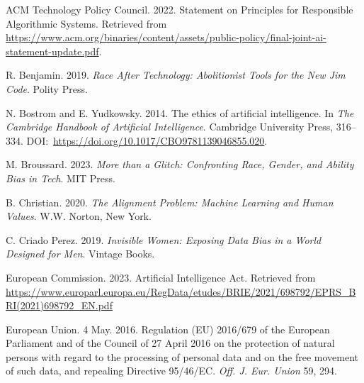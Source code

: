 \begin{thebibliography}{}

 ACM Technology Policy Council. 2022. Statement on Principles for Responsible Algorithmic Systems. Retrieved from \href{https://www.acm.org/binaries/content/assets/public-policy/final-joint-ai-statement-update.pdf}{https://{\allowbreak}www.{\allowbreak}acm.{\allowbreak}org/{\allowbreak}binaries/{\allowbreak}content/{\allowbreak}assets/{\allowbreak}public-{\allowbreak}policy/{\allowbreak}final-{\allowbreak}joint-{\allowbreak}ai-{\allowbreak}statement-{\allowbreak}update.pdf}.


 R. Benjamin. 2019. \textit{Race After Technology: Abolitionist Tools for the New Jim Code}. Polity Press.

 N. Bostrom and E. Yudkowsky. 2014. The ethics of artificial intelligence. In \textit{The Cambridge Handbook of Artificial Intelligence}. Cambridge University Press, 316--334. DOI:~\href{https://doi.org/10.1017/CBO9781139046855.020}{https://{\allowbreak}doi.{\allowbreak}org/{\allowbreak}10.{\allowbreak}1017/{\allowbreak}CBO9781139046855.020}.

 M. Broussard. 2023. \textit{More than a Glitch: Confronting Race, Gender, and Ability Bias in Tech}. MIT Press.

 B. Christian. 2020. \textit{The Alignment Problem: Machine Learning and Human Values}. W.W. Norton, New York.

 C. Criado Perez. 2019. \textit{Invisible Women: Exposing Data Bias in a World Designed for Men}. Vintage Books.

 European Commission. 2023. Artificial Intelligence Act. Retrieved from \href{https://www.europarl.europa.eu/RegData/etudes/BRIE/2021/698792/EPRS\_BRI(2021)698792\_EN.pdf}{https://{\allowbreak}www.{\allowbreak}europarl.{\allowbreak}europa.{\allowbreak}eu/{\allowbreak}RegData/{\allowbreak}etudes/{\allowbreak}BRIE/{\allowbreak}2021/{\allowbreak}698792/{\allowbreak}EPRS\_{\allowbreak}BRI{\allowbreak}(2021){\allowbreak}698792\_{\allowbreak}EN.pdf}


 European Union. 4 May. 2016. Regulation (EU) 2016/679 of the European Parliament and of the Council of 27 April 2016 on the protection of natural persons with regard to the processing of personal data and on the free movement of such data, and repealing Directive 95/46/EC. \textit{Off. J. Eur. Union} 59, 294.



\end{thebibliography}
